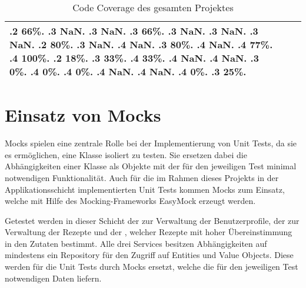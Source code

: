 \begin{table}[ht]
\begin{tabular}{|l|c|c|}
\begin{minipage}{2.5cm}
{            .2 66\%.
            .3 NaN.
            .3 NaN.
            .3 66\%.
            .3 NaN.
            .3 NaN.
            .3 NaN.
            .2 80\%.
            .3 NaN.
            .4 NaN.
            .3 80\%.
            .4 NaN.
            .4 77\%.
            .4 100\%.
            .2 18\%.
            .3 33\%.
            .4 33\%.
            .4 NaN.
            .4 NaN.
            .3 0\%.
            .4 0\%.
            .4 0\%.
            .4 NaN.
            .4 NaN.
            .4 0\%.
            .3 25\%.
        }\end{minipage} \\
        \hline
    \end{tabular}
    \caption{Code Coverage des gesamten Projektes}
    \label{tab:code-coverage-full}
\end{table}

\section{Einsatz von Mocks}
\label{sec:mocks}
Mocks spielen eine zentrale Rolle bei der Implementierung von Unit Tests, da sie es ermöglichen, eine Klasse isoliert zu testen. Sie ersetzen dabei die Abhängigkeiten einer Klasse als Objekte mit der für den jeweiligen Test minimal notwendigen Funktionalität. Auch für die im Rahmen dieses Projekts in der Applikationsschicht implementierten Unit Tests kommen Mocks zum Einsatz, welche mit Hilfe des Mocking-Frameworks EasyMock erzeugt werden.

Getestet werden in dieser Schicht der  zur Verwaltung der Benutzerprofile, der  zur Verwaltung der Rezepte und der , welcher Rezepte mit hoher Übereinstimmung in den Zutaten bestimmt. Alle drei Services besitzen Abhängigkeiten auf mindestens ein Repository für den Zugriff auf Entities und Value Objects. Diese werden für die Unit Tests durch Mocks ersetzt, welche die für den jeweiligen Test notwendigen Daten liefern.
